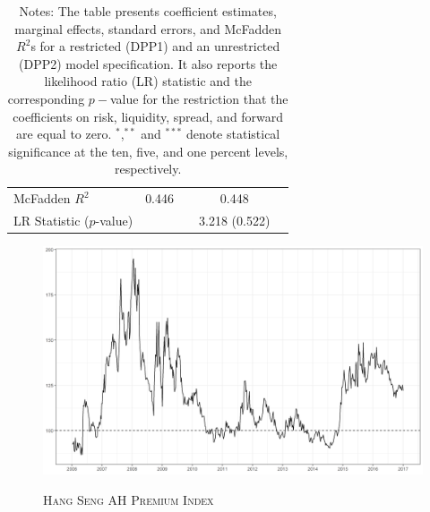 \documentclass[11pt]{article}
\begin{document}
\begin{table}[!ht]
\begin{center}
{\begin{tabular}{l c  c c c }
\midrule

McFadden  $R^2$   &  0.446          &               &  0.448          &           \\

LR Statistic ($p$-value)       &             &             & 3.218 (0.522)    & \\
\bottomrule

\end{tabular}
}
\caption*{\scriptsize Notes: The table presents coefficient estimates, marginal effects, standard errors, and McFadden $R^2$s for a restricted (DPP1) and an unrestricted (DPP2) model specification. It also reports the likelihood ratio (LR) statistic and the corresponding $p-$value for the restriction that the coefficients on risk, liquidity, spread, and forward are equal to zero. $^{*}$,$^{**}$ and $^{***}$ denote statistical significance at the ten, five, and one percent levels, respectively.}
\label{tab:probitf}
\end{center}
\end{table}


\clearpage
\newpage

\begin{figure}[!htbp]
     \caption{\textsc{Hang Seng AH Premium Index} }
    \centering
    \includegraphics[width = .7\textwidth]{plot-AHind.png}
    \label{fig:AHind}
\end{figure}
\end{document}
